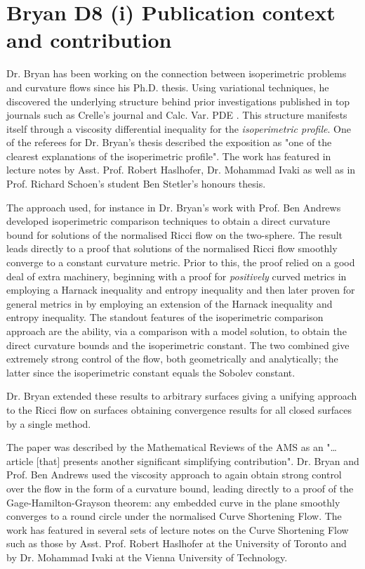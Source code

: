 \documentclass[12pt]{article}
\author{Paul Bryan}
\date{}
\title{}
\begin{document}
\section*{Bryan D8 (i) Publication context and contribution}
\label{sec:orgheadline1}

Dr. Bryan has been working on the connection between isoperimetric problems and curvature flows since his Ph.D. thesis. Using variational techniques, he discovered the underlying structure behind prior investigations published in top journals such as Crelle's journal and Calc. Var. PDE \cite{MR2729306,MR2794630,MR2843240,Bryan}. This structure manifests itself through a viscosity differential inequality for the \emph{isoperimetric profile}. One of the referees for Dr. Bryan's thesis described the exposition as "one of the clearest explanations of the isoperimetric profile". The work has featured in lecture notes by Asst. Prof. Robert Haslhofer, Dr. Mohammad Ivaki as well as in Prof. Richard Schoen's student Ben Stetler's honours thesis.

The approach used, for instance in Dr. Bryan's work with Prof. Ben Andrews \cite{MR2729306} developed isoperimetric comparison techniques to obtain a direct curvature bound for solutions of the normalised Ricci flow on the two-sphere. The result leads directly to a proof that solutions of the normalised Ricci flow smoothly converge to a constant curvature metric. Prior to this, the proof relied on a good deal of extra machinery, beginning with a proof for \emph{positively} curved metrics in employing a Harnack inequality and entropy inequality and then later proven for general metrics in by employing an extension of the Harnack inequality and entropy inequality. The standout features of the isoperimetric comparison approach are the ability, via a comparison with a model solution, to obtain the direct curvature bounds and the isoperimetric constant. The two combined give extremely strong control of the flow, both geometrically and analytically; the latter since the isoperimetric constant equals the Sobolev constant.

Dr. Bryan extended these results to arbitrary surfaces \cite{Bryan} giving a unifying approach to the Ricci flow on surfaces obtaining convergence results for all closed surfaces by a single method.

The paper \cite{MR2794630} was described by the Mathematical Reviews of the AMS as an "\ldots{}article [that] presents another significant simplifying contribution". Dr. Bryan and Prof. Ben Andrews used the viscosity approach to again obtain strong control over the flow in the form of a curvature bound, leading directly to a proof of the Gage-Hamilton-Grayson theorem: any embedded curve in the plane smoothly converges to a round circle under the normalised Curve Shortening Flow. The work has featured in several sets of lecture notes on the Curve Shortening Flow such as those by Asst. Prof. Robert Haslhofer at the University of Toronto and by Dr. Mohammad Ivaki at the Vienna University of Technology.
\end{document}
